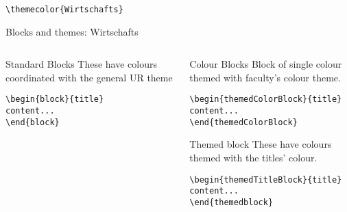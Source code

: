 \begingroup
{}
\begin{center}\verb|\themecolor{Wirtschafts}|\end{center}
\begin{frame}[fragile]{Blocks and themes: Wirtschafts}
\begin{columns} %
\begin{column}{0.3\textwidth}
\begin{block}{Standard Blocks}
These have colours coordinated with the general UR theme
\begin{verbatim}
\begin{block}{title}
content...
\end{block}
\end{verbatim}
\end{block}
\end{column}
\begin{column}{0.7\textwidth}
\begin{themedColorBlock}{Colour Blocks}
Block of single colour themed with faculty's colour theme.
\small
\begin{verbatim}
\begin{themedColorBlock}{title}
content...
\end{themedColorBlock}
\end{verbatim}
\end{themedColorBlock}
\begin{themedTitleBlock} {Themed block}
These have colours themed with the titles' colour.
\small
\begin{verbatim}
\begin{themedTitleBlock}{title}
content...
\end{themedblock}
\end{verbatim}
\end{themedTitleBlock}
\end{column}
\end{columns}
\end{frame}
\endgroup


